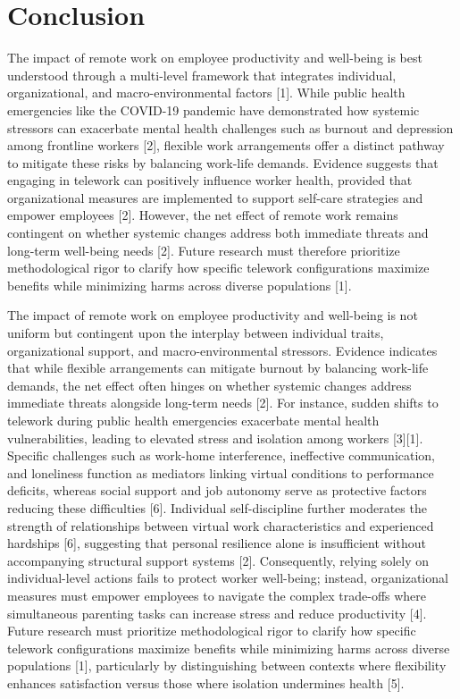 \documentclass[11pt]{article}
\begin{document}
\section{Conclusion}
The impact of remote work on employee productivity and well-being is best understood through a multi-level framework that integrates individual, organizational, and macro-environmental factors [1]. While public health emergencies like the COVID-19 pandemic have demonstrated how systemic stressors can exacerbate mental health challenges such as burnout and depression among frontline workers [2], flexible work arrangements offer a distinct pathway to mitigate these risks by balancing work-life demands. Evidence suggests that engaging in telework can positively influence worker health, provided that organizational measures are implemented to support self-care strategies and empower employees [2]. However, the net effect of remote work remains contingent on whether systemic changes address both immediate threats and long-term well-being needs [2]. Future research must therefore prioritize methodological rigor to clarify how specific telework configurations maximize benefits while minimizing harms across diverse populations [1].

The impact of remote work on employee productivity and well-being is not uniform but contingent upon the interplay between individual traits, organizational support, and macro-environmental stressors. Evidence indicates that while flexible arrangements can mitigate burnout by balancing work-life demands, the net effect often hinges on whether systemic changes address immediate threats alongside long-term needs [2]. For instance, sudden shifts to telework during public health emergencies exacerbate mental health vulnerabilities, leading to elevated stress and isolation among workers [3][1]. Specific challenges such as work-home interference, ineffective communication, and loneliness function as mediators linking virtual conditions to performance deficits, whereas social support and job autonomy serve as protective factors reducing these difficulties [6]. Individual self-discipline further moderates the strength of relationships between virtual work characteristics and experienced hardships [6], suggesting that personal resilience alone is insufficient without accompanying structural support systems [2]. Consequently, relying solely on individual-level actions fails to protect worker well-being; instead, organizational measures must empower employees to navigate the complex trade-offs where simultaneous parenting tasks can increase stress and reduce productivity [4]. Future research must prioritize methodological rigor to clarify how specific telework configurations maximize benefits while minimizing harms across diverse populations [1], particularly by distinguishing between contexts where flexibility enhances satisfaction versus those where isolation undermines health [5].
\end{document}
